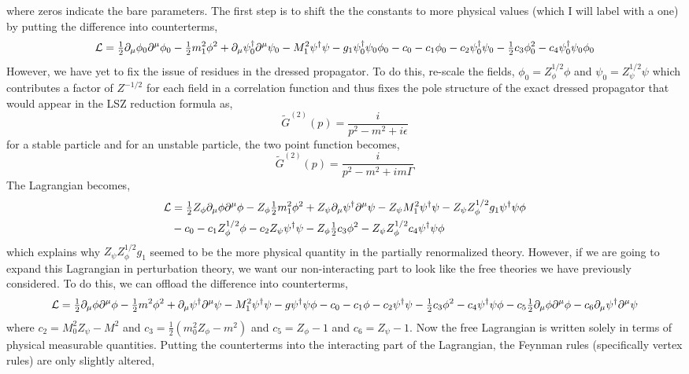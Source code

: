\documentclass[12pt]{extarticle}
\begin{document}
where zeros indicate the bare parameters. The first step is to shift the the constants to more physical values (which I will label with a one) by putting the difference into counterterms,
\[ \mathcal{L} = \tfrac{1}{2} \partial_\mu \phi_0 \partial^\mu \phi_0 - \tfrac{1}{2} m_1^2 \phi^2 + \partial_\mu \psi^\dagger_0 \partial^\mu \psi_0 - M_1^2 \psi^\dagger \psi - g_1 \psi^\dagger_0 \psi_0 \phi_0 - c_0 - c_1 \phi_0 - c_2 \psi^\dagger_0 \psi_0 -\tfrac{1}{2} c_3 \phi_0^2 - c_4 \psi^\dagger_0 \psi_0 \phi_0 \]  
However, we have yet to fix the issue of residues in the dressed propagator. To do this, re-scale the fields, $\phi_0 = Z^{1/2}_\phi \phi$ and $\psi_0= Z^{1/2}_\psi \psi$ which contributes a factor of $Z^{-1/2}$ for each field in a correlation function and thus fixes the pole structure of the exact dressed propagator that would appear in the LSZ reduction formula as,
\[ \tilde{G}^{(2)}(p) = \frac{i}{p^2 - m^2 + i \epsilon} \] 
for a stable particle and for an unstable particle, the two point function becomes,
\[ \tilde{G}^{(2)}(p) = \frac{i}{p^2 - m^2 + i m \Gamma} \] 
The Lagrangian becomes,
\begin{align*}
\mathcal{L} & = \tfrac{1}{2} Z_\phi \partial_\mu \phi \partial^\mu \phi - Z_\phi \tfrac{1}{2} m_1^2 \phi^2 + Z_\psi \partial_\mu \psi^\dagger \partial^\mu \psi - Z_\psi M_1^2 \psi^\dagger \psi - Z_\psi Z_\phi^{1/2} g_1 \psi^\dagger \psi \phi 
\\
& - c_0 - c_1 Z_\phi^{1/2} \phi - c_2 Z_\psi \psi^\dagger \psi - Z_\phi \tfrac{1}{2} c_3 \phi^2 - Z_\psi Z_\phi^{1/2} c_4 \psi^\dagger \psi \phi
\end{align*} 
which explains why $Z_\psi Z_\phi^{1/2} g_1$ seemed to be the more physical quantity in the partially renormalized theory. However, if we are going to expand this Lagrangian in perturbation theory, we want our non-interacting part to look like the free theories we have previously considered. To do this, we can offload the difference into counterterms, 
\[ \mathcal{L} = \tfrac{1}{2} \partial_\mu \phi \partial^\mu \phi -  \tfrac{1}{2} m^2 \phi^2 + \partial_\mu \psi^\dagger \partial^\mu \psi - M_1^2 \psi^\dagger \psi - g \psi^\dagger \psi \phi - c_0 - c_1 \phi - c_2 \psi^\dagger \psi - \tfrac{1}{2} c_3 \phi^2 - c_4 \psi^\dagger \psi \phi - c_5 \tfrac{1}{2} \partial_\mu \phi \partial^\mu \phi - c_6 \partial_\mu \psi^\dagger \partial^\mu \psi \] 
where $c_2 = M_0^2 Z_\psi - M^2$ and $c_3 = \tfrac{1}{2} (m_0^2 Z_\phi - m^2)$ and $c_5 = Z_\phi - 1$ and $c_6 = Z_\psi - 1$. 
Now the free Lagrangian is written solely in terms of physical measurable quantities. 
Putting the counterterms into the interacting part of the Lagrangian, the Feynman rules (specifically vertex rules) are only slightly altered, 
\end{document}
